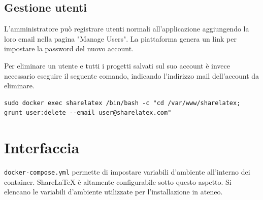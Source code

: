 \subsection{Gestione utenti}
L'amministratore può registrare utenti normali all'applicazione aggiungendo la loro email nella pagina "Manage Users". La piattaforma genera un link per impostare la password del nuovo account.

Per eliminare un utente e tutti i progetti salvati sul suo account è invece necessario eseguire il seguente comando, indicando l'indirizzo mail dell'account da eliminare.
\begin{lstlisting}
sudo docker exec sharelatex /bin/bash -c "cd /var/www/sharelatex; grunt user:delete --email user@sharelatex.com"
\end{lstlisting}

\section{Interfaccia}
\verb|docker-compose.yml| permette di impostare variabili d'ambiente all'interno dei container. ShareLaTeX è altamente configurabile sotto questo aspetto. Si elencano le variabili d'ambiente utilizzate per l'installazione in ateneo.
